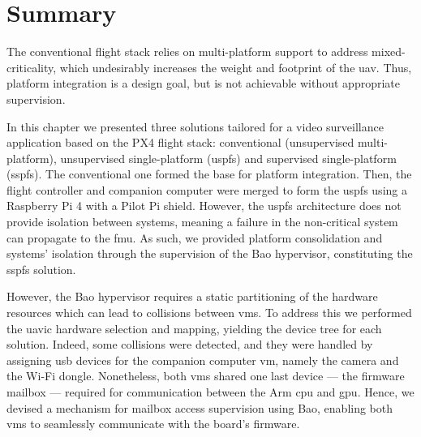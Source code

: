 \section{Summary}
\label{sec:summary}
The conventional flight stack relies on multi-platform support to address
mixed-criticality, which undesirably increases the weight and footprint of the
\gls{uav}. Thus, platform integration is a design goal, but is not achievable
without appropriate supervision.

In this chapter we presented three solutions tailored for a video surveillance
application based on the PX4 flight stack: conventional (unsupervised multi-platform), unsupervised
single-platform (\gls{uspfs}) and supervised single-platform (\gls{sspfs}). The conventional one formed the
base for platform integration. Then, the flight controller and companion
computer were merged to form the \gls{uspfs} using a Raspberry Pi 4 with a Pilot
Pi shield. However, the \gls{uspfs}
architecture does not provide isolation between systems, meaning a failure in
the non-critical system can propagate to the \gls{fmu}. As such, we provided
platform consolidation and systems' isolation through the supervision of the Bao
hypervisor, constituting the \gls{sspfs} solution.

However, the Bao hypervisor requires a static partitioning of the hardware
resources which can lead to collisions between \glspl{vm}. To address this we
performed the \gls{uavic} hardware selection and mapping, yielding the device
tree for each solution. Indeed, some collisions were detected, and they were
handled by assigning \gls{usb} devices for the companion computer \gls{vm},
namely the camera and the Wi-Fi dongle. Nonetheless, both \glspl{vm} shared one
last device --- the firmware mailbox --- required for communication between the
Arm \gls{cpu} and \gls{gpu}. Hence, we devised a mechanism for mailbox
access supervision using Bao, enabling both \glspl{vm} to seamlessly communicate
with the board's firmware.


